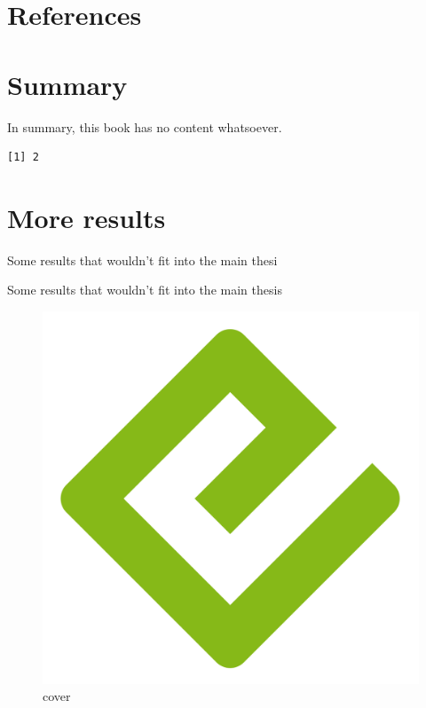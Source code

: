 \documentclass[
  a4paper,
]{scrbook}
\newlength{\cslhangindent}
\newlength{\cslentryspacingunit} %
\newenvironment{CSLReferences}[2] %
 {%
  \setlength{\parindent}{0pt}
  \ifodd #1
  \let\oldpar\par
  \def\par{\hangindent=\cslhangindent\oldpar}
  \fi
  \setlength{\parskip}{#2\cslentryspacingunit}
 }%
 {}
\begin{document}
\hypertarget{references}{%
\chapter*{References}\label{references}}

\hypertarget{refs}{}
\begin{CSLReferences}{0}{0}
\end{CSLReferences}

\hypertarget{summary-1}{%
\chapter{Summary}\label{summary-1}}

In summary, this book has no content whatsoever.

\begin{verbatim}
[1] 2
\end{verbatim}

\appendix
{}

\hypertarget{sec-more-results}{%
\chapter{More results}\label{sec-more-results}}

Some results that wouldn't fit into the main thesi

Some results that wouldn't fit into the main thesis

\begin{figure}

{\centering \includegraphics{./cover.png}

}

\caption{cover}

\end{figure}


\backmatter
\end{document}
